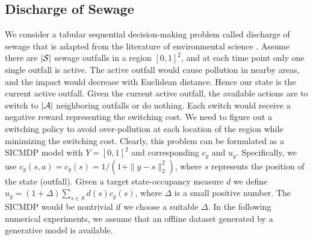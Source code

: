 \subsection{Discharge of Sewage}
\label{Experiment_Discharge_of_Sewage}
We consider a tabular sequential decision-making problem called discharge of sewage that is adapted from the literature of environmental science \citep{gorr1972optimal}.
Assume there are $|{\mathcal{S}}|$ sewage outfalls in a region $[0, 1]^2$, and at each time point only one single outfall is active.
The active outfall would cause pollution in nearby areas, and the impact would decrease with Euclidean distance. 
Hence our state is the current active outfall. 
Given the current active outfall, the available actions are to switch to $|{\mathcal{A}}|$ neighboring outfalls or do nothing.
Each switch would receive a negative reward representing the switching cost.
We need to figure out a switching policy to avoid over-pollution at each location of the region while minimizing the switching cost.
Clearly, this problem can be formulated as a SICMDP model with $Y=[0,1]^2$ and corresponding $c_y$ and $u_y$.
Specifically, we use $c_y(s, a)=c_y(s)=1/(1+\|y-s\|^2_2)$, where $s$ represents the position of the state (outfall).
Given a target state-occupancy measure $d$ we define $u_y=(1+\Delta)\sum_{s\in S} d(s)c_y(s)$, where $\Delta$ is a small positive number. 
The SICMDP would be nontrivial if we choose a suitable $\Delta$.
In the following numerical experiments, we assume that an offline dataset generated by a generative model is available.
